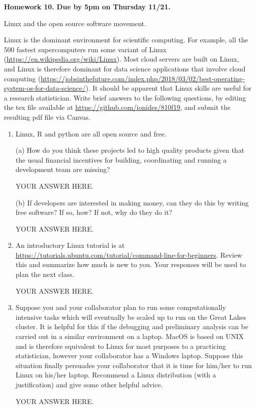 \documentclass[12pt]{article}
\begin{document}
\begin{center}\bf
Homework 10. Due by 5pm on Thursday 11/21.

Linux and the open source software movement.

\end{center}

Linux is the dominant environment for scientific computing. For example, all the 500 fastest  supercomputers run some variant of Linux (\url{https://en.wikipedia.org/wiki/Linux}). Most cloud servers are built on Linux, and Linux is therefore dominant for data science applications that involve cloud computing (\url{https://jobsinthefuture.com/index.php/2018/03/02/best-operating-system-os-for-data-science/}). It should be apparent that Linux skills are useful for a research statistician. Write brief answers to the following questions, by editing the tex file available at \url{https://github.com/ionides/810f19}, and submit the resulting pdf file via Canvas.

\begin{enumerate}

\item Linux, R and python are all open source and free. 

(a) How do you think these projects led to high quality products given that the  usual financial incentives for building, coordinating and running a development team are missing?

YOUR ANSWER HERE.

(b) If developers are interested in making money, can they do this by writing free software? If so, how? If not, why do they do it?

YOUR ANSWER HERE.

\item An introductory Linux tutorial is at\\
  \url{https://tutorials.ubuntu.com/tutorial/command-line-for-beginners}.
Review this and summarize how much is new to you. Your responses will be used to plan the next class.

YOUR ANSWER HERE.

\item Suppose you and your collaborator plan to run some computationally intensive tasks which will eventually be scaled up to run on the Great Lakes cluster. It is helpful for this if the debugging and preliminary analysis can be carried out in a similar environment on a laptop.  MacOS is based on UNIX and is therefore equivalent to Linux for most purposes to a practicing statistician, however your collaborator has a Windows laptop. Suppose this situation finally persuades your collaborator that it is time for him/her to run Linux on his/her laptop. Recommend a Linux distribution (with a justification) and give some other helpful advice.

YOUR ANSWER HERE.

\end{enumerate}
\end{document}
